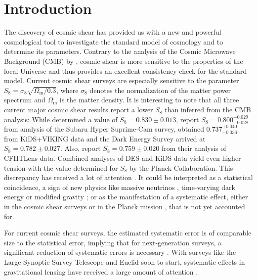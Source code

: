 \documentclass[referee]{aa} %
\renewcommand{\[}{\begin{equation}}
\renewcommand{\]}{\end{equation}}
\renewcommand{\rm}{\mathrm}
\begin{document}

   \maketitle

%
\section{Introduction}
The discovery of cosmic shear has provided us with a new and powerful cosmological tool to investigate the standard model of cosmology and to determine its parameters. Contrary to the analysis of the Cosmic Microwave Background (CMB) by \citet{2018arXiv180706209P}, cosmic shear is more sensitive to the properties of the local Universe and thus provides an excellent consistency check for the standard model. Current cosmic shear surveys are especially sensitive to the parameter $S_8=\sigma_8 \sqrt{\Omega_{\rm m}/0.3}$, where $\sigma_8$ denotes the normalization of the matter power spectrum and $\Omega_{\rm m}$ is the matter density.
It is interesting to note that all three current major cosmic shear results report a lower $S_8$ than inferred from the CMB analysis: While \citet{2018arXiv180706209P} determined a value of $S_8 = 0.830 \pm 0.013$, \citet{2018arXiv180909148H} report $S_8 = 0.800^{+0.029}_{-0.028}$ from analysis of the Subaru Hyper Suprime-Cam survey, \citet[][hereafter H18]{2018arXiv181206076H} obtained $0.737_{-0.036}^{+0.040}$ from KiDS+VIKING data and the Dark Energy Survey \citep[DES,][]{2018PhRvD..98d3528T} arrived at $S_8=0.782\pm 0.027$. Also, \citet{2013MNRAS.432.2433H} report $S_8 = 0.759 \pm 0.020$ from their analysis of CFHTLens data. Combined analyses of DES and KiDS data \citep{Joudaki:2019,2019A&A...624A.134A} yield even higher tension with the value determined for $S_8$ by the Planck Collaboration. This discrepancy has received a lot of attention \citep{2017MNRAS.471.1259J,2016MNRAS.459..971K}. It could be interpreted as a statistical coincidence, a sign of new physics like massive neutrinos \citep{2014PhRvL.112e1303B}, time-varying dark energy or modified gravity \citep{2016A&A...594A..14P}; or as the manifestation of a systematic effect, either in the cosmic shear surveys or in the Planck mission \citep{2016ApJ...818..132A}, that is not yet accounted for. 

For current cosmic shear surveys, the estimated systematic error is of comparable size to the statistical error, implying that for next-generation surveys, a significant reduction of systematic errors is necessary \citep[][hereafter H17]{2017MNRAS.465.1454H}. With surveys like the Large Synoptic Survey Telescope \citep[LSST,][]{Ivezic:2008} and Euclid \citep{Laureijs:2011} soon to start, systematic effects in gravitational lensing have received a large amount of attention \citep{2018arXiv181002353A,2019arXiv190207439B,2019arXiv190109488S}. %
\end{document}
